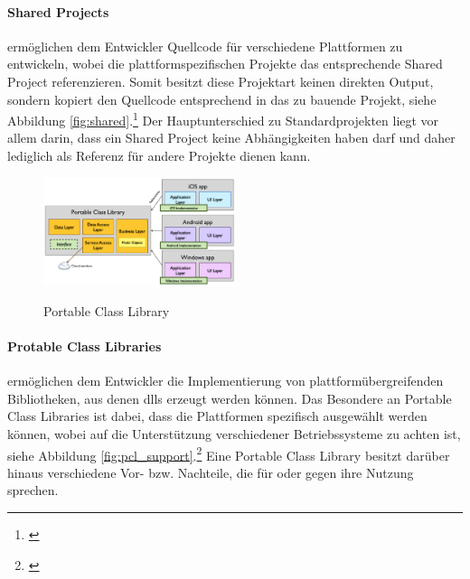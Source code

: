 \paragraph{Shared Projects}

ermöglichen dem Entwickler Quellcode für verschiedene Plattformen zu entwickeln, wobei die plattformspezifischen Projekte das entsprechende Shared Project referenzieren. Somit besitzt diese Projektart keinen direkten Output, sondern kopiert den Quellcode entsprechend in das zu bauende Projekt, siehe Abbildung \eqref{fig:shared}.\footnote{\citep[vgl.][Shared Projects - Xamarin]{Xamarin.SharedProjects}\label{note39}} Der Hauptunterschied zu Standardprojekten liegt vor allem darin, dass ein Shared Project keine Abhängigkeiten haben darf und daher lediglich als Referenz für andere Projekte dienen kann.

\begin{figure}
	\begin{center}
		\includegraphics[width=0.5\textwidth]{images/technische_grundlagen/PortableClassLibrary.png}
	\end{center}
	\caption{Portable Class Library}
	\cite{Xamarin.PortableClass}
	\label{fig:portable}
\end{figure}

\paragraph{Protable Class Libraries}

ermöglichen dem Entwickler die Implementierung von plattformübergreifenden Bibliotheken, aus denen \glspl{dll} erzeugt werden können. Das Besondere an Portable Class Libraries ist dabei, dass die Plattformen spezifisch ausgewählt werden können, wobei auf die Unterstützung verschiedener Betriebssysteme zu achten ist, siehe Abbildung \eqref{fig:pcl_support}.\footnote{\citep[vgl.][Introduction to Portable Class Libraries - Xamarin]{Xamarin.PortableClass}\label{note40}} Eine Portable Class Library besitzt darüber hinaus verschiedene Vor- bzw. Nachteile, die für oder gegen ihre Nutzung sprechen.\\

